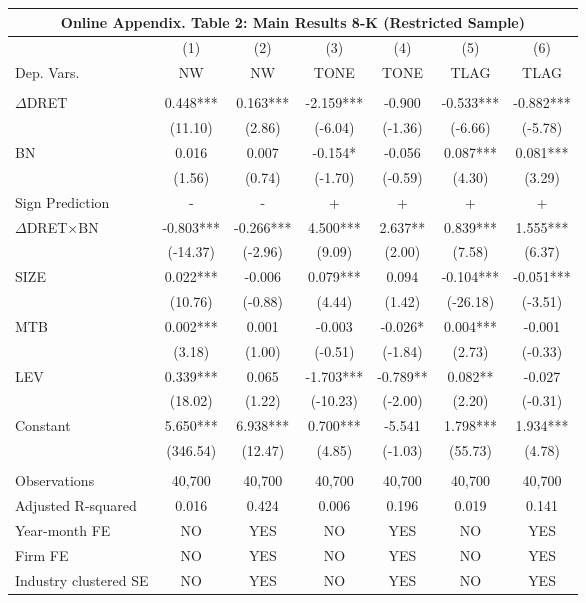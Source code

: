 \begin{table}[htbp] \label{oat2}
  \centering
    \begin{tabular}{lcccccc}
    \multicolumn{7}{c}{\textbf{Online Appendix. Table 2: Main Results 8-K (Restricted Sample)}} \\
    \midrule
    \midrule
      & (1) & (2) & (3) & (4) & (5) & (6) \\
    Dep. Vars. & NW & NW & TONE & TONE & TLAG & TLAG \\
    \midrule
      &   &   &   &   &   &  \\
    $\Delta$DRET & 0.448*** & 0.163*** & -2.159*** & -0.900 & -0.533*** & -0.882*** \\
    & (11.10) & (2.86) & (-6.04) & (-1.36) & (-6.66) & (-5.78) \\
    BN & 0.016 & 0.007 & -0.154* & -0.056 & 0.087*** & 0.081*** \\
    & (1.56) & (0.74) & (-1.70) & (-0.59) & (4.30) & (3.29) \\
    \rowcolor[rgb]{ .933,  .925,  .882} Sign Prediction & - & - & + & + & + & + \\
    \rowcolor[rgb]{ .933,  .925,  .882} $\Delta$DRET$\times$BN & -0.803*** & -0.266*** & 4.500*** & 2.637** & 0.839*** & 1.555*** \\
    \rowcolor[rgb]{ .933,  .925,  .882}   & (-14.37) & (-2.96) & (9.09) & (2.00) & (7.58) & (6.37) \\
    SIZE & 0.022*** & -0.006 & 0.079*** & 0.094 & -0.104*** & -0.051*** \\
    & (10.76) & (-0.88) & (4.44) & (1.42) & (-26.18) & (-3.51) \\
    MTB & 0.002*** & 0.001 & -0.003 & -0.026* & 0.004*** & -0.001 \\
    & (3.18) & (1.00) & (-0.51) & (-1.84) & (2.73) & (-0.33) \\
    LEV & 0.339*** & 0.065 & -1.703*** & -0.789** & 0.082** & -0.027 \\
    & (18.02) & (1.22) & (-10.23) & (-2.00) & (2.20) & (-0.31) \\
    Constant & 5.650*** & 6.938*** & 0.700*** & -5.541 & 1.798*** & 1.934*** \\
    & (346.54) & (12.47) & (4.85) & (-1.03) & (55.73) & (4.78) \\
    &   &   &   &   &   &  \\
    Observations & 40,700 & 40,700 & 40,700 & 40,700 & 40,700 & 40,700 \\
    Adjusted R-squared & 0.016 & 0.424 & 0.006 & 0.196 & 0.019 & 0.141 \\
    Year-month FE & NO & YES & NO & YES & NO & YES \\
    Firm FE & NO & YES & NO & YES & NO & YES \\
    Industry clustered SE & NO & YES & NO & YES & NO & YES \\
    \bottomrule
    \bottomrule
    \end{tabular}%
\end{table}%